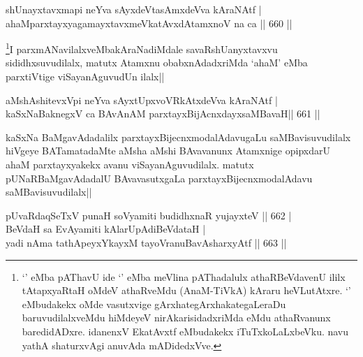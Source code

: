 
\begin{shl}
shUnayxtavxmapi neYva sAyxdeVtasAmxdeVva kAraNAtf | \\
ahaMparxtayxyagamayxtavxmeVkatAvxdAtamxnoV na ca \hfill||  660 ||  
\end{shl}	


\begin{artha}
\footnote{`\stext' eMba pAThavU ide `\stext' eMba meVlina pAThadalulx athaRBeVdavenU ililx tAtapxyaRtaH oMdeV athaRveMdu (AnaM-TiVkA) kAraru heVLutAtxre. `\stext' eMbudakekx oMde vasutxvige gArxhategArxhakategaLeraDu baruvudilalxveMdu hiMdeyeV nirAkarisidadxriMda eMdu athaRvanunx baredidADxre. idanenxV EkatAvxtf eMbudakekx iTuTxkoLaLxbeVku. navu yathA shaturxvAgi anuvAda mADidedxVve.}I parxmANavilalxveMbakAraNadiMdale savaRshUanyxtavxvu sididhxsuvudilalx, matutx Atamxnu obabxnAdadxriMda `ahaM' eMba parxtiVtige viSayanAguvudUn ilalx||
\end{artha}

\begin{shl}
aMshAshitevxV\s pi neYva sAyxtUpxvoVRkAtxdeVva kAraNAtf | \\
kaSxNaBaknegxV ca BAvAnAM parxtayxBijAcnxdayxsaMBavaH\hfill ||  661 ||  
\end{shl}

\begin{artha}
kaSxNa BaMgavAdadalilx parxtayxBijecnxmodalAdavugaLu saMBavisuvudilalx hiVgeye BATamatadaMte aMsha aMshi BAvavanunx Atamxnige opipxdarU ahaM parxtayxyakekx avanu viSayanAguvudilalx. matutx pUNaRBaMgavAdadalU BAvavasutxgaLa parxtayxBijecnxmodalAdavu saMBavisuvudilalx||
\end{artha}

\begin{shl}
pUvaRdaqSeTxV punaH soV\s yamiti budidhxnaR yujayxteV \hfill||  662 | \\
BeVdaH sa EvAyamiti kAlarUpAdiBeVdataH | \\
yadi nAma tathA\s peyxYkayxM tayoVranuBavAsharxyAtf \hfill||  663 ||  
\end{shl}

